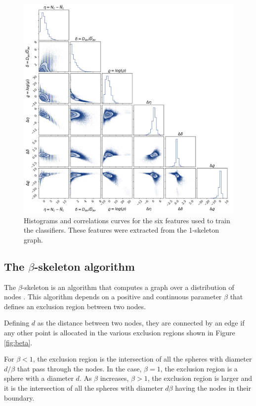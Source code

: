 \documentclass[usenatbib]{mnras}
\begin{document}
\begin{figure}
        \includegraphics[scale=0.46]{Figs/p_all_features_correlations.pdf}
    \caption{Histograms and correlations curves for the six features
      used to train the classifiers. These features were extracted from the 1-skeleton graph.}
    \label{fig:features}
\end{figure}

\subsection{The $\beta$-skeleton algorithm}

The $\beta$-skeleton is an algorithm that computes a graph over a
distribution of nodes \citep{Kirkpatrick1985, Fang2019}.  
This algorithm depends on a positive and continuous parameter $\beta$
that defines an exclusion region between two nodes.

Defining $d$ as the distance between two nodes, they are connected by
an edge if any other point is allocated in the various exclusion
regions shown in Figure \ref{fig:beta}.  

For $\beta<1$, the exclusion region is the intersection of all the 
spheres with diameter $d/\beta$ that pass through the nodes. In the
case, $\beta=1$, the exclusion region is a sphere with a diameter $d$.
As $\beta$ increases, $\beta>1$, the exclusion region is larger and it
is the intersection of all the spheres with diameter $d\beta$ having
the nodes in their boundary.  
\end{document}

